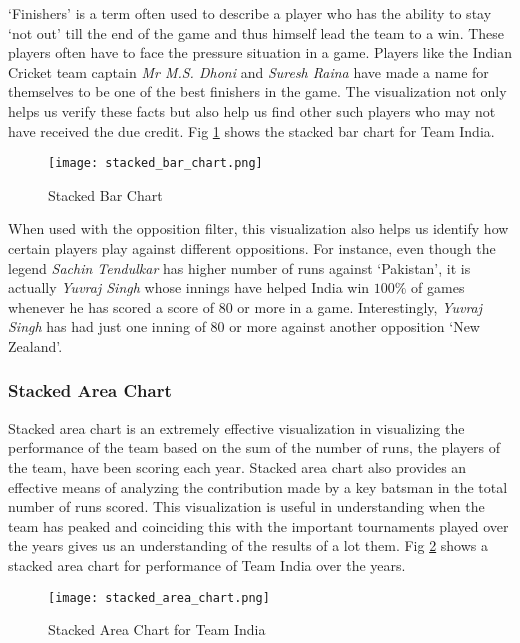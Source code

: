 \documentclass[10pt,journal,compsoc]{IEEEtran}
\begin{document}
\indent `Finishers' is a term often used to  describe  a player who has the ability to stay `not out' till the end of the game and thus himself lead the team to a win. These players often have to face the pressure situation in a game. Players like the Indian Cricket team captain \textit{Mr M.S. Dhoni} and \textit{Suresh Raina} have made a name for themselves to be one of the best finishers in the game. The visualization not only helps us verify these facts but also help us find other such players who may not have received the due credit. Fig \ref{fig:stacked_bar_chart} shows the stacked bar chart for Team India.\\

\begin{figure}[ht]
\texttt{[image: stacked\_bar\_chart.png]}
\caption{Stacked Bar Chart}
\label{fig:stacked_bar_chart}
\end{figure}

\indent When used with the opposition filter, this visualization also helps us identify how certain players play against different oppositions. For instance, even though the legend \textit{Sachin Tendulkar} has higher number of runs against `Pakistan', it is actually \textit{Yuvraj Singh} whose innings have helped India win $100\%$ of games whenever he has scored a score of 80 or more in a game. Interestingly, \textit{Yuvraj Singh} has had just one inning of $80$ or more against another opposition `New Zealand'.

\subsubsection {Stacked Area Chart}
Stacked area chart is an extremely effective visualization in visualizing the performance of the team based on the sum of the number of runs, the players of the team, have been scoring each year. Stacked area chart also provides an effective means of analyzing the contribution made by a key batsman in the total number of runs scored. This visualization is useful in understanding when the team has peaked and coinciding this with the important tournaments played over the years gives us an understanding of the results of a lot them. Fig \ref{fig:stacked_area_chart} shows a stacked area chart for performance of Team India over the years.\\

\begin{figure}[ht]
\texttt{[image: stacked\_area\_chart.png]}
\caption{Stacked Area Chart for Team India}
\label{fig:stacked_area_chart}
\end{figure}
\end{document}
